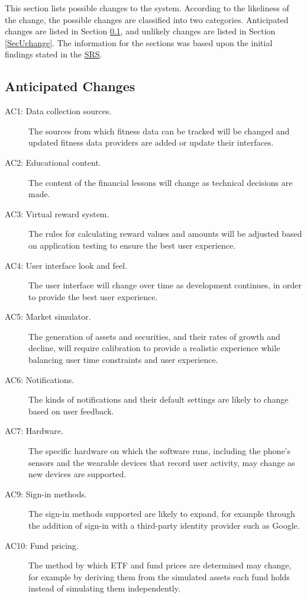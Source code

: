 \documentclass[12pt, titlepage]{article}
\begin{document}
This section lists possible changes to the system. According to the likeliness
of the change, the possible changes are classified into two
categories. Anticipated changes are listed in Section \ref{SecAchange}, and
unlikely changes are listed in Section \ref{SecUchange}. The information for the sections was based 
upon the initial findings stated in the \href{URL}{SRS}.

\subsection{Anticipated Changes} \label{SecAchange}

\begin{description}
  \item[AC1: Data collection sources.] The sources from which fitness data can be tracked will be changed and updated fitness data providers are added or update their interfaces.
  \item[AC2: Educational content.] The content of the financial lessons will change as technical decisions are made.
  \item[AC3: Virtual reward system.] The rules for calculating reward values and amounts will be adjusted based on application testing to ensure the best user experience.
  \item[AC4: User interface look and feel.] The user interface will change over time as development continues, in order to provide the best user experience.
  \item[AC5: Market simulator.] The generation of assets and securities, and their rates of growth and decline, will require calibration to provide a realistic experience while balancing user time constraints and user experience.
  \item[AC6: Notifications.] The kinds of notifications and their default settings are likely to change based on user feedback.
  \item[AC7: Hardware.] The specific hardware on which the software runs, including the phone's sensors and the wearable devices that record user activity, may change as new devices are supported.
  \item[AC9: Sign-in methods.] The sign-in methods supported are likely to expand, for example through the addition of sign-in with a third-party identity provider such as Google.
  \item[AC10: Fund pricing.] The method by which ETF and fund prices are determined may change, for example by deriving them from the simulated assets each fund holds instead of simulating them independently.
\end{description}
\end{document}
